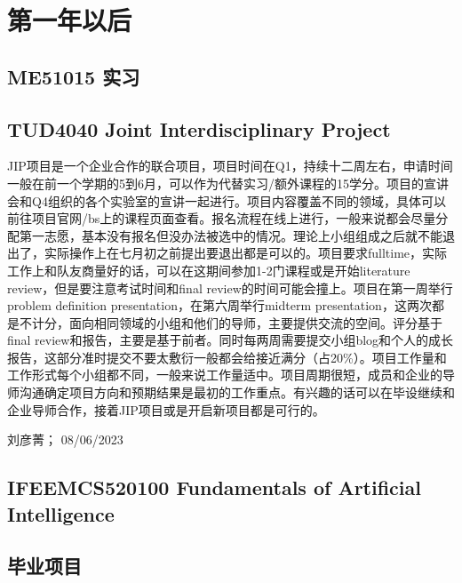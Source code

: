 \section{第一年以后}
\subsection{ME51015 实习}
\subsection{TUD4040 Joint Interdisciplinary Project}
JIP项目是一个企业合作的联合项目，项目时间在Q1，持续十二周左右，申请时间一般在前一个学期的5到6月，可以作为代替实习/额外课程的15学分。项目的宣讲会和Q4组织的各个实验室的宣讲一起进行。项目内容覆盖不同的领域，具体可以前往项目官网/bs上的课程页面查看。报名流程在线上进行，一般来说都会尽量分配第一志愿，基本没有报名但没办法被选中的情况。理论上小组组成之后就不能退出了，实际操作上在七月初之前提出要退出都是可以的。项目要求fulltime，实际工作上和队友商量好的话，可以在这期间参加1-2门课程或是开始literature review，但是要注意考试时间和final review的时间可能会撞上。项目在第一周举行problem definition presentation，在第六周举行midterm presentation，这两次都是不计分，面向相同领域的小组和他们的导师，主要提供交流的空间。评分基于final review和报告，主要是基于前者。同时每两周需要提交小组blog和个人的成长报告，这部分准时提交不要太敷衍一般都会给接近满分（占20\%）。项目工作量和工作形式每个小组都不同，一般来说工作量适中。项目周期很短，成员和企业的导师沟通确定项目方向和预期结果是最初的工作重点。有兴趣的话可以在毕设继续和企业导师合作，接着JIP项目或是开启新项目都是可行的。

\begin{flushright}
刘彦菁； 08/06/2023
\end{flushright}
\subsection{IFEEMCS520100 Fundamentals of Artificial Intelligence}

\subsection{毕业项目}
